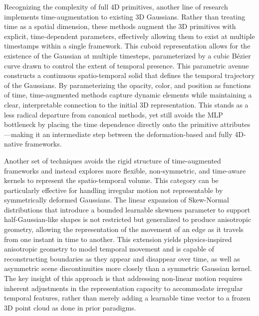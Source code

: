 \documentclass[11pt,a4paper]{article}
\begin{document}
Recognizing the complexity of full 4D primitives, another line of research implements time-augmentation to existing 3D Gaussians. Rather than treating time as a spatial dimension, these methods augment the 3D primitives with explicit, time-dependent parameters, effectively allowing them to exist at multiple timestamps within a single framework. This cuboid representation allows for the existence of the Gaussian at multiple timesteps, parameterized by a cubic B\'{e}zier curve drawn to control the extent of temporal presence. This parametric avenue constructs a continuous spatio-temporal solid that defines the temporal trajectory of the Gaussians. By parameterizing the opacity, color, and position as functions of time, time-augmented methods capture dynamic elements while maintaining a clear, interpretable connection to the initial 3D representation. This stands as a less radical departure from canonical methods, yet still avoids the MLP bottleneck by placing the time dependence directly onto the primitive attributes---making it an intermediate step between the deformation-based and fully 4D-native frameworks.

Another set of techniques avoids the rigid structure of time-augmented frameworks and instead explores more flexible, non-symmetric, and time-aware kernels to represent the spatio-temporal volume. This category can be particularly effective for handling irregular motion not representable by symmetrically deformed Gaussians. The linear expansion of Skew-Normal distributions that introduce a bounded learnable skewness parameter to support half-Gaussian-like shapes is not restricted but generalized to produce anisotropic geometry, allowing the representation of the movement of an edge as it travels from one instant in time to another. This extension yields physics-inspired anisotropic geometry to model temporal movement and is capable of reconstructing boundaries as they appear and disappear over time, as well as asymmetric scene discontinuities more closely than a symmetric Gaussian kernel. The key insight of this approach is that addressing non-linear motion requires inherent adjustments in the representation capacity to accommodate irregular temporal features, rather than merely adding a learnable time vector to a frozen 3D point cloud as done in prior paradigms.
\end{document}
